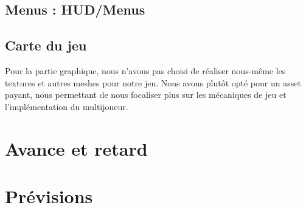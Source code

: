 \documentclass[french, 12pt]{article}
\begin{document}
    
    \subsection{Menus : HUD/Menus}


    \subsection{Carte du jeu}

    Pour la partie graphique, nous n'avons pas choisi de réaliser
    nous-même les textures et autres meshes pour notre jeu.
    Nous avons plutôt opté pour un asset payant,
    nous permettant de nous focaliser plus sur les mécaniques de jeu et l'implémentation
    du multijoueur.


\section{Avance et retard}

\section{Prévisions}
\end{document}
